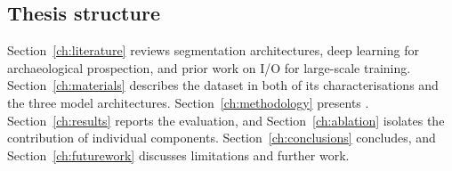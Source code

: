 \subsection{Thesis structure}

Section~\ref{ch:literature} reviews segmentation architectures, deep learning for
archaeological prospection, and prior work on I/O for large-scale training.
Section~\ref{ch:materials} describes the dataset in both of its characterisations
and the three model architectures.
Section~\ref{ch:methodology} presents \pads{}.
Section~\ref{ch:results} reports the evaluation, and Section~\ref{ch:ablation}
isolates the contribution of individual components.
Section~\ref{ch:conclusions} concludes, and Section~\ref{ch:futurework} discusses
limitations and further work.
